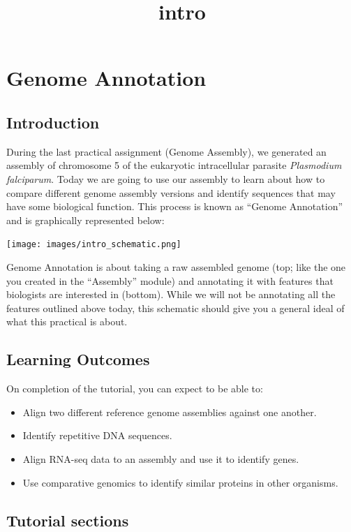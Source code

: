 \documentclass[11pt]{article}
\title{intro}
\providecommand{\tightlist}{%
      \setlength{\itemsep}{0pt}\setlength{\parskip}{0pt}}
\begin{document}
    \hypertarget{genome-annotation}{%
\section{Genome Annotation}\label{genome-annotation}}

\hypertarget{introduction}{%
\subsection{Introduction}\label{introduction}}

During the last practical assignment (Genome Assembly), we generated an
assembly of chromosome 5 of the eukaryotic intracellular parasite
\textit{Plasmodium falciparum}. Today we are going to use our assembly to
learn about how to compare different genome assembly versions and
identify sequences that may have some biological function. This process
is known as ``Genome Annotation'' and is graphically represented below:

\texttt{[image: images/intro\_schematic.png]}

Genome Annotation is about taking a raw assembled genome (top; like the
one you created in the ``Assembly'' module) and annotating it with
features that biologists are interested in (bottom). While we will not
be annotating all the features outlined above today, this schematic
should give you a general ideal of what this practical is about.

    \hypertarget{learning-outcomes}{%
\subsection{Learning Outcomes}\label{learning-outcomes}}

On completion of the tutorial, you can expect to be able to:

\begin{itemize}
\tightlist
\item
  Align two different reference genome assemblies against one another.
\item
  Identify repetitive DNA sequences.
\item
  Align RNA-seq data to an assembly and use it to identify genes.
\item
  Use comparative genomics to identify similar proteins in other
  organisms.
\end{itemize}

    \hypertarget{tutorial-sections}{%
\subsection{Tutorial sections}\label{tutorial-sections}}
\end{document}

